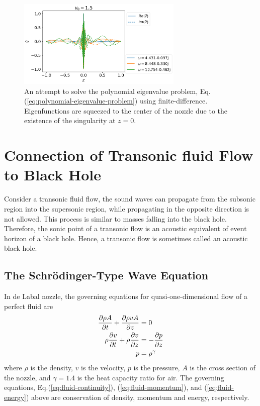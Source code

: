 \begin{figure} [htbp]
	\centering
	\includegraphics[width=0.7\textwidth]{img/results-bad-accelerating-v}
	\caption{An attempt to solve the polynomial eigenvalue problem, Eq.(\ref{eq:polynomial-eigenvalue-problem}) using finite-difference. Eigenfunctions are squeezed to the center of the nozzle due to the existence of the singularity at $z=0$.}
	\label{fig:failure-of-spectral-method}
\end{figure}

\section{Connection of Transonic fluid Flow to Black Hole}
Consider a transonic fluid flow, the sound waves can propagate from the subsonic region into the supersonic region, while propagating in the opposite direction is not allowed. This process is similar to masses falling into the black hole. Therefore, the sonic point of a transonic flow is an acoustic equivalent of event horizon of a black hole. Hence, a transonic flow is sometimes called an acoustic black hole. \cite{okuzumi_sakagami_quasinormal_2007}

\subsection{The Schr{\"o}dinger-Type Wave Equation}
In de Labal nozzle, the governing equations for quasi-one-dimensional flow of a perfect fluid are
\begin{align}
	\pdv{\rho A}{t}	+ \pdv{\rho vA}{z} & = 0            \label{eq:fluid-continuity} \\
	\rho\pdv{v}{t}	+ \rho\pdv{v}{z}    & = -\pdv{p}{z}  \label{eq:fluid-momentum}   \\
	p                                  & = \rho^\gamma \label{eq:fluid-energy}
\end{align}
where $\rho$ is the density, $v$ is the velocity, $p$ is the pressure, $A$ is the cross section of the nozzle, and $\gamma=1.4$ is the heat capacity ratio for air. The governing equations, Eq.(\ref{eq:fluid-continuity}), (\ref{eq:fluid-momentum}), and (\ref{eq:fluid-energy}) above are conservation of density, momentum and energy, respectively.

